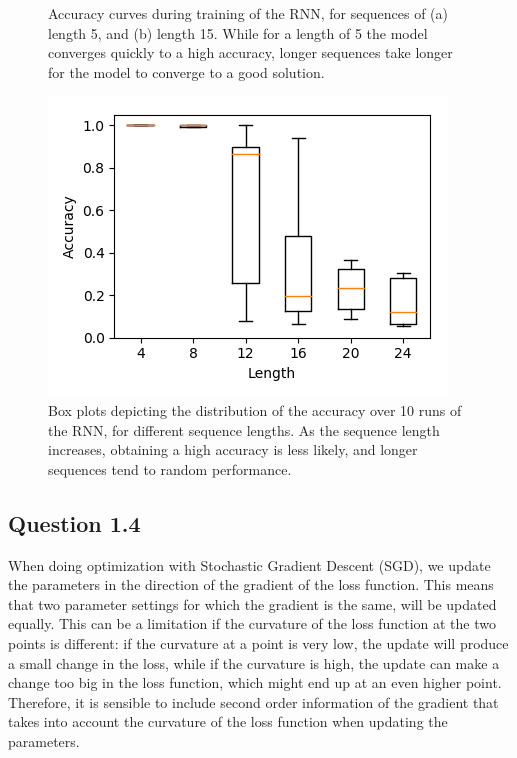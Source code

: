 \documentclass{article}
\begin{document}
\begin{figure}[t]
\begin{subfigure}{0.49\textwidth}
\caption{}
\end{subfigure}
 \caption{Accuracy curves during training of the RNN, for sequences of (a) length 5, and (b) length 15. While for a length of 5 the model converges quickly to a high accuracy, longer sequences take longer for the model to converge to a good solution.}
\label{fig:rnn_acc_curves}
\end{figure}

\begin{figure}[t]
\centering
\includegraphics[scale=0.7]{img/rnn-acc-Lbox}
 \caption{Box plots depicting the distribution of the accuracy over 10 runs of the RNN, for different sequence lengths. As the sequence length increases, obtaining a high accuracy is less likely, and longer sequences tend to random performance.}
\label{fig:rnn_acc_box}
\end{figure}

\subsection*{Question 1.4}

When doing optimization with Stochastic Gradient Descent (SGD), we update the parameters in the direction of the gradient of the loss function. This means that two parameter settings for which the gradient is the same, will be updated equally. This can be a limitation if the curvature of the loss function at the two points is different: if the curvature at a point is very low, the update will produce a small change in the loss, while if the curvature is high, the update can make a change too big in the loss function, which might end up at an even higher point. Therefore, it is sensible to include second order information of the gradient that takes into account the curvature of the loss function when updating the parameters.
\end{document}
